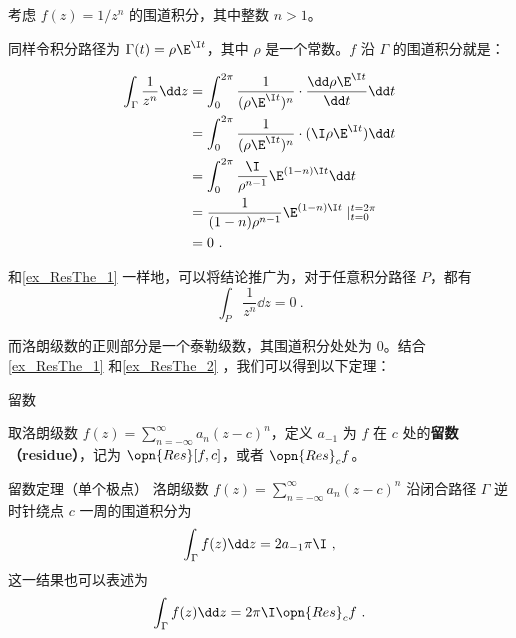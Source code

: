 \begin{example}{}\label{ex_ResThe_2}
考虑 $f(z)=1/z^n$ 的围道积分，其中整数 $n>1$。

同样令积分路径为 $\Gamma(t)=\rho\E^{\I t}$，其中 $\rho$ 是一个常数。$f$ 沿 $\Gamma$ 的围道积分就是：

\begin{equation}
\begin{aligned}
\int_{\Gamma}\frac{1}{z^n}\dd z&=\int^{2\pi}_0\frac{1}{(\rho\E^{\I t})^n}\cdot\frac{\dd\rho\E^{\I t}}{\dd t}\dd t\\
&=\int_0^{2\pi}\frac{1}{(\rho\E^{\I t})^n}\cdot (\I \rho \E^{\I t})\dd t\\
&=\int_0^{2\pi}\frac{\I}{\rho^{n-1}}\E^{(1-n)\I t}\dd t\\
&=\frac{1}{(1-n)\rho^{n-1}}\E^{(1-n)\I t}\mid^{t=2\pi}_{t=0}\\
&=0~.
\end{aligned}
\end{equation}

和\autoref{ex_ResThe_1} 一样地，可以将结论推广为，对于任意积分路径 $P$，都有
\begin{equation}
\int_P\frac{1}{z^n}\dd z=0~.
\end{equation}

\end{example}

而洛朗级数的正则部分是一个泰勒级数，其围道积分处处为 $0$。结合\autoref{ex_ResThe_1} 和\autoref{ex_ResThe_2} ，我们可以得到以下定理：

\begin{definition}{留数}

取洛朗级数 $f(z)=\sum\limits_{n=-\infty}^{\infty} a_n(z-c)^n$，定义 $a_{-1}$ 为 $f$ 在 $c$ 处的\textbf{留数（residue）}，记为 $\opn{Res}[f, c]$，或者 $\opn{Res}_cf$。

\end{definition}

\begin{theorem}{留数定理（单个极点）}\label{the_ResThe_1}
洛朗级数 $f(z)=\sum\limits_{n=-\infty}^{\infty} a_n(z-c)^n$ 沿闭合路径 $\Gamma$ 逆时针绕点 $c$ 一周的围道积分为
\begin{equation}
\int_\Gamma f(z)\dd z=2a_{-1}\pi\I~,
\end{equation}
这一结果也可以表述为
\begin{equation}
\int_\Gamma f(z)\dd z=2\pi\I\opn{Res}_cf~.
\end{equation}

\end{theorem}

